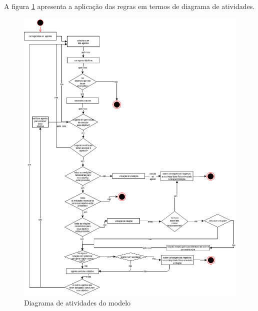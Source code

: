 A figura \ref{atividiagram} apresenta a aplicação das regras em termos de diagrama de atividades. 

\begin{figure}[H]
  \centering
  \includegraphics[width=1\linewidth]{figure/DiagramaDeAtividade.png} 
  \caption{Diagrama de atividades do modelo}
  \label{atividiagram}
\end{figure}
